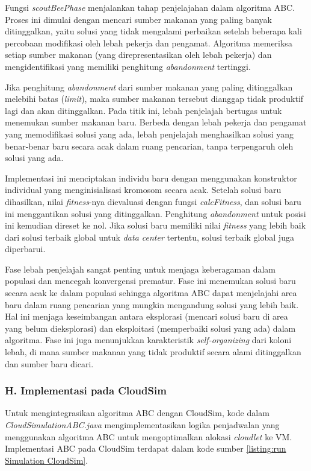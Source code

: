 Fungsi \textit{scoutBeePhase} menjalankan tahap penjelajahan dalam algoritma ABC. Proses ini dimulai dengan mencari sumber makanan yang paling banyak ditinggalkan, yaitu solusi yang tidak mengalami perbaikan setelah beberapa kali percobaan modifikasi oleh lebah pekerja dan pengamat. Algoritma memeriksa setiap sumber makanan (yang direpresentasikan oleh lebah pekerja) dan mengidentifikasi yang memiliki penghitung \textit{abandonment} tertinggi.

Jika penghitung \textit{abandonment} dari sumber makanan yang paling ditinggalkan melebihi batas (\textit{limit}), maka sumber makanan tersebut dianggap tidak produktif lagi dan akan ditinggalkan. Pada titik ini, lebah penjelajah bertugas untuk menemukan sumber makanan baru. Berbeda dengan lebah pekerja dan pengamat yang memodifikasi solusi yang ada, lebah penjelajah menghasilkan solusi yang benar-benar baru secara acak dalam ruang pencarian, tanpa terpengaruh oleh solusi yang ada.

Implementasi ini menciptakan individu baru dengan menggunakan konstruktor individual yang menginisialisasi kromosom secara acak. Setelah solusi baru dihasilkan, nilai \textit{fitness}-nya dievaluasi dengan fungsi \textit{calcFitness}, dan solusi baru ini menggantikan solusi yang ditinggalkan. Penghitung \textit{abandonment} untuk posisi ini kemudian direset ke nol. Jika solusi baru memiliki nilai \textit{fitness} yang lebih baik dari solusi terbaik global untuk \textit{data center} tertentu, solusi terbaik global juga diperbarui.

Fase lebah penjelajah sangat penting untuk menjaga keberagaman dalam populasi dan mencegah konvergensi prematur. Fase ini menemukan solusi baru secara acak ke dalam populasi sehingga algoritma ABC dapat menjelajahi area baru dalam ruang pencarian yang mungkin mengandung solusi yang lebih baik. Hal ini menjaga keseimbangan antara eksplorasi (mencari solusi baru di area yang belum dieksplorasi) dan eksploitasi (memperbaiki solusi yang ada) dalam algoritma. Fase ini juga menunjukkan karakteristik \textit{self-organizing} dari koloni lebah, di mana sumber makanan yang tidak produktif secara alami ditinggalkan dan sumber baru dicari.

\subsubsection{H. Implementasi pada CloudSim}
Untuk mengintegrasikan algoritma ABC dengan CloudSim, kode dalam \textit{CloudSimulationABC.java} mengimplementasikan logika penjadwalan yang menggunakan algoritma ABC untuk mengoptimalkan alokasi \textit{cloudlet} ke VM. Implementasi ABC pada CloudSim terdapat dalam kode sumber \ref{listing:run Simulation CloudSim}.

